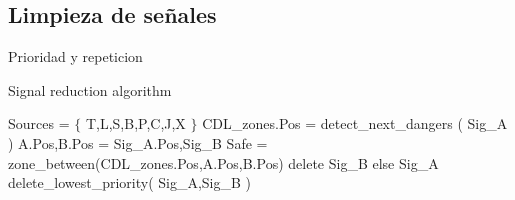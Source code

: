 \subsection{Limpieza de señales}

Prioridad y repeticion
\lipsum[1]

\begin{algorithm}[hbt!]
        \caption{Signal reduction algorithm}\label{alg:reduction}
        \DontPrintSemicolon
        \SetNoFillComment
        \LinesNotNumbered 
        Sources = $\{$ T,L,S,B,P,C,J,X $\}$\;
        {
            {
             CDL\_zones.Pos = detect\_next\_dangers ( Sig\_A )\;
             A.Pos,B.Pos = Sig\_A.Pos,Sig\_B\;
             Safe = zone\_between(CDL\_zones.Pos,A.Pos,B.Pos)\;
                 {
                    {
                        {
                            {
                                {
                                    {
                                        delete Sig\_B  else Sig\_A
                                    }
                                }
                            }
                        }
                        {
                            delete\_lowest\_priority( Sig\_A,Sig\_B )\;
                        }
                    }
                }
            }
        }
        \KwResult{[Signals]} 
    \end{algorithm}